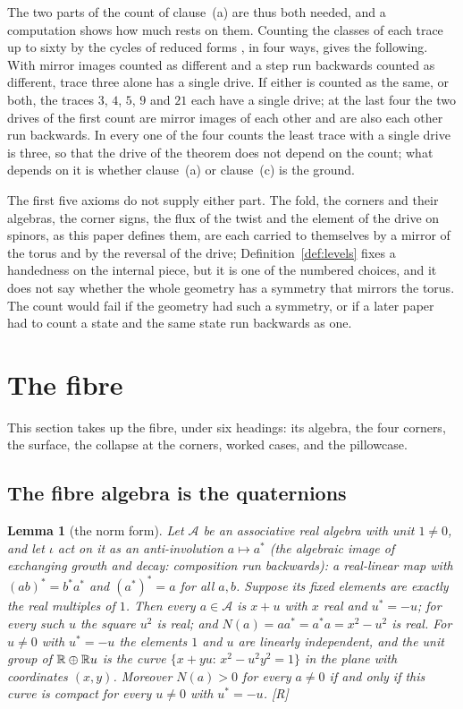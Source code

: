 \documentclass[11pt,a4paper]{article}
\theoremstyle{plain}
\newtheorem{lemma}[theorem]{Lemma}
\theoremstyle{definition}
\theoremstyle{remark}
\newcommand{\rigR}{[\textup{R}]}
\begin{document}
The two parts of the count of clause~(a) are thus both needed, and a computation shows how much rests on them. Counting the classes of each trace up to sixty by the cycles of reduced forms \cite{Gauss1801}, in four ways, gives the following. With mirror images counted as different and a step run backwards counted as different, trace three alone has a single drive. If either is counted as the same, or both, the traces $3$, $4$, $5$, $9$ and $21$ each have a single drive; at the last four the two drives of the first count are mirror images of each other and are also each other run backwards. In every one of the four counts the least trace with a single drive is three, so that the drive of the theorem does not depend on the count; what depends on it is whether clause~(a) or clause~(c) is the ground.

The first five axioms do not supply either part. The fold, the corners and their algebras, the corner signs, the flux of the twist and the element of the drive on spinors, as this paper defines them, are each carried to themselves by a mirror of the torus and by the reversal of the drive; Definition~\ref{def:levels} fixes a handedness on the internal piece, but it is one of the numbered choices, and it does not say whether the whole geometry has a symmetry that mirrors the torus. The count would fail if the geometry had such a symmetry, or if a later paper had to count a state and the same state run backwards as one.

\section{The fibre}\label{sec:fibre}

This section takes up the fibre, under six headings: its algebra, the four corners, the surface, the collapse at the corners, worked cases, and the pillowcase.

\subsection{The fibre algebra is the quaternions}

\begin{lemma}[the norm form]\label{lem:norm}
Let $\mathcal{A}$ be an associative real algebra with unit $1\neq0$, and let $\iota$ act on it as an anti-involution $a\mapsto a^{*}$ (the algebraic image of exchanging growth and decay: composition run backwards): a real-linear map with $(ab)^{*}=b^{*}a^{*}$ and $(a^{*})^{*}=a$ for all $a,b$. Suppose its fixed elements are exactly the real multiples of $1$. Then every $a\in\mathcal{A}$ is $x+u$ with $x$ real and $u^{*}=-u$; for every such $u$ the square $u^{2}$ is real; and $N(a)=aa^{*}=a^{*}a=x^{2}-u^{2}$ is real. For $u\neq0$ with $u^{*}=-u$ the elements $1$ and $u$ are linearly independent, and the unit group of $\mathbb{R}\oplus\mathbb{R} u$ is the curve $\{x+yu:\,x^{2}-u^{2}y^{2}=1\}$ in the plane with coordinates $(x,y)$. Moreover $N(a)>0$ for every $a\neq0$ if and only if this curve is compact for every $u\neq0$ with $u^{*}=-u$. \rigR
\end{lemma}
\end{document}
